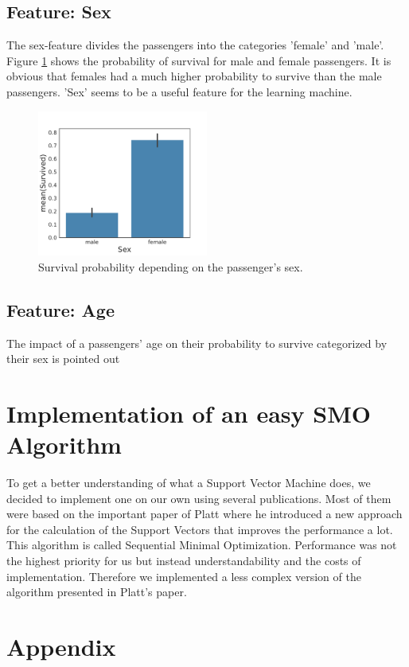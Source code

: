 \subsection{Feature: Sex}
The sex-feature divides the passengers into the categories 'female' and 'male'. Figure \ref{fig:sexfeat} shows the probability of survival for male and female passengers. It is obvious that females had a much higher probability to survive than the male passengers. 'Sex' seems to be a useful feature for the learning machine.
 \begin{figure}
 	\centering
    \includegraphics[width=0.5\textwidth]{media_saved/sex_survived}
  \caption{Survival probability depending on the passenger's sex.}
  \label{fig:sexfeat}
 \end{figure}

\subsection{Feature: Age}
The impact of a passengers' age on their probability to survive categorized by their sex is pointed out 

\section{Implementation of an easy SMO Algorithm}
To get a better understanding of what a Support Vector Machine does, we decided to implement one on our own using several publications. Most of them were based on the important paper of Platt \cite{platt} where he introduced a new approach for the calculation of the Support Vectors that improves the performance a lot. This algorithm is called Sequential Minimal Optimization. Performance was not the highest priority for us but instead understandability and the costs of implementation. Therefore we implemented a less complex version of the algorithm presented in Platt's paper.

\section*{Appendix}
\appendix
